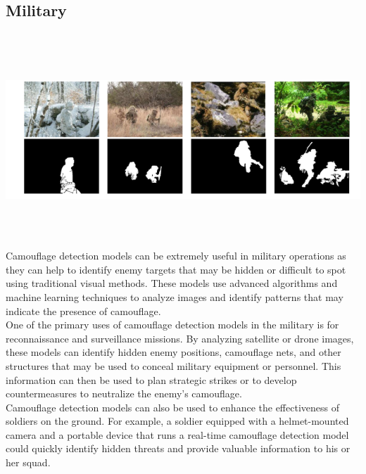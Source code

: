 \begin{multicols}{2}
\subsection{{{\fontsize{14}{19}\selectfont \textbf{Military}}}}
\vspace{0.5cm}
\includegraphics[width=\columnwidth,height=8cm]{sections/LBP/use3.png}
\vspace{0.5cm}
Camouflage detection models can be extremely useful in military operations as they can help to identify enemy targets that may be hidden or difficult to spot using traditional visual methods. These models use advanced algorithms and machine learning techniques to analyze images and identify patterns that may indicate the presence of camouflage.\\
One of the primary uses of camouflage detection models in the military is for reconnaissance and surveillance missions. By analyzing satellite or drone images, these models can identify hidden enemy positions, camouflage nets, and other structures that may be used to conceal military equipment or personnel. This information can then be used to plan strategic strikes or to develop countermeasures to neutralize the enemy's camouflage.\\
Camouflage detection models can also be used to enhance the effectiveness of soldiers on the ground. For example, a soldier equipped with a helmet-mounted camera and a portable device that runs a real-time camouflage detection model could quickly identify hidden threats and provide valuable information to his or her squad.

\vspace{0.5cm}

\end{multicols}
